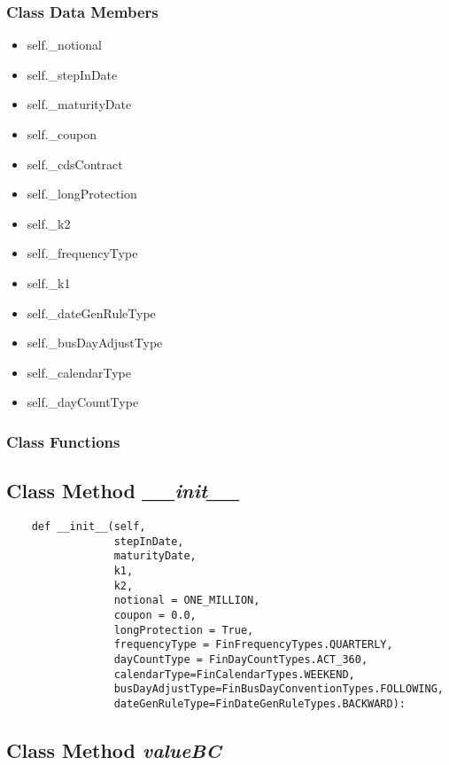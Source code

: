 \documentclass[twoside,11pt]{book}
\begin{document}
\subsubsection{Class Data Members}
\begin{itemize}
\item{self.\_notional}
\item{self.\_stepInDate}
\item{self.\_maturityDate}
\item{self.\_coupon}
\item{self.\_cdsContract}
\item{self.\_longProtection}
\item{self.\_k2}
\item{self.\_frequencyType}
\item{self.\_k1}
\item{self.\_dateGenRuleType}
\item{self.\_busDayAdjustType}
\item{self.\_calendarType}
\item{self.\_dayCountType}
\end{itemize}

\subsubsection{Class Functions}

\subsection{Class Method {\it \_\_init\_\_}}


\begin{lstlisting}
    def __init__(self, 
                 stepInDate,
                 maturityDate, 
                 k1, 
                 k2, 
                 notional = ONE_MILLION, 
                 coupon = 0.0, 
                 longProtection = True,
                 frequencyType = FinFrequencyTypes.QUARTERLY,
                 dayCountType = FinDayCountTypes.ACT_360,
                 calendarType=FinCalendarTypes.WEEKEND,
                 busDayAdjustType=FinBusDayConventionTypes.FOLLOWING,
                 dateGenRuleType=FinDateGenRuleTypes.BACKWARD):
\end{lstlisting}

\subsection{Class Method {\it valueBC}}
\end{document}
